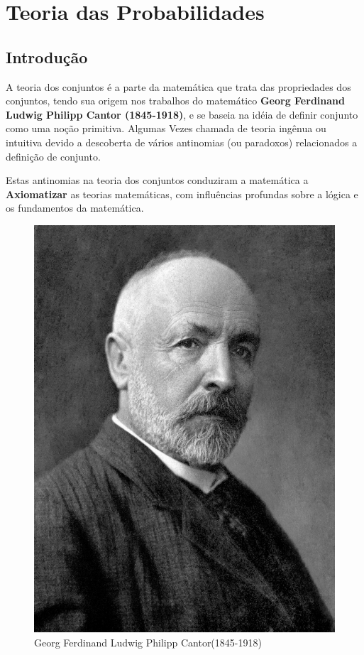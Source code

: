 \chapter{Teoria das Probabilidades}
\section{Introdução}

\inic A teoria dos conjuntos é a parte da matemática que trata das propriedades dos conjuntos, tendo sua origem nos trabalhos do matemático \textbf{Georg Ferdinand Ludwig Philipp Cantor (1845-1918)}, e se baseia na idéia de definir conjunto como uma noção primitiva. Algumas Vezes chamada de teoria ingênua ou intuitiva devido a descoberta de vários antinomias (ou paradoxos) relacionados a definição de conjunto.\vskip0.3cm

\inic Estas antinomias na teoria dos conjuntos conduziram a matemática a \textbf{Axiomatizar} as teorias  matemáticas, com influências profundas sobre a lógica e os fundamentos da matemática.


\begin{figure}
    \centering
    \includegraphics[scale=0.08]{figures/Cantor1.jpeg}
    \caption{Georg Ferdinand
Ludwig Philipp Cantor(1845-1918)}
    \label{fig:my_label}
\end{figure}



